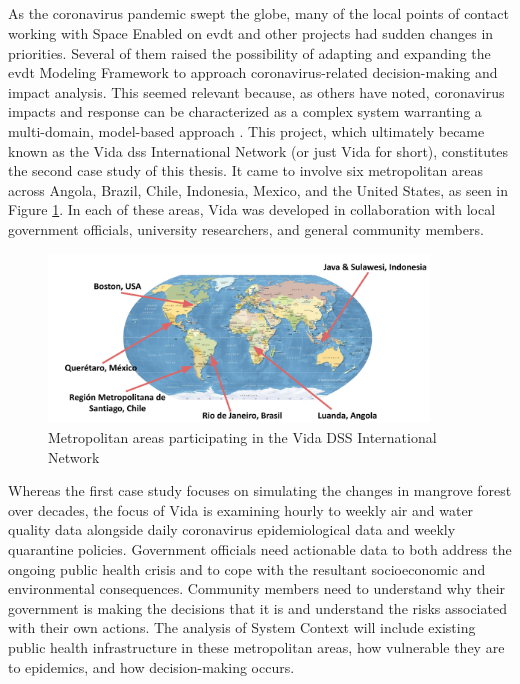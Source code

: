 \subsection{} \label{sec:vida-saf-method}

\subsubsection{}

As the coronavirus pandemic swept the globe, many of the local points of contact working with Space Enabled on \ac{evdt} and other projects had sudden changes in priorities. Several of them raised the possibility of adapting and expanding the \ac{evdt} Modeling Framework to approach coronavirus-related decision-making and impact analysis. This seemed relevant because, as others have noted, coronavirus impacts and response can be characterized as a complex system warranting a multi-domain, model-based approach \cite{deweckHandlingCOVID192020}. This project,  which ultimately became known as the Vida \ac{dss} International Network (or just Vida for short), constitutes the second case study of this thesis. It came to involve six metropolitan areas across Angola, Brazil, Chile, Indonesia, Mexico, and the United States, as seen in Figure \ref{fig:vida_map}. In each of these areas, Vida was developed in collaboration with local government officials, university researchers, and general community members. 

\begin{figure}[h]
	\centering
	\includegraphics[width=0.9\textwidth]{Figures/chap5/vida_map.png}
	\caption{Metropolitan areas participating in the Vida DSS International Network}
	\label{fig:vida_map}
\end{figure}


Whereas the first case study focuses on simulating the changes in mangrove forest over decades, the focus of Vida is examining hourly to weekly air and water quality data alongside daily coronavirus epidemiological data and weekly quarantine policies. Government officials need actionable data to both address the ongoing public health crisis and to cope with the resultant socioeconomic and environmental consequences. Community members need to understand why their government is making the decisions that it is and understand the risks associated with their own actions. The analysis of System Context will include existing public health infrastructure in these metropolitan areas, how vulnerable they are to epidemics, and how decision-making occurs.  


